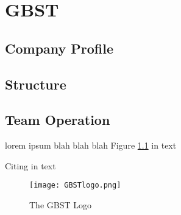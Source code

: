 \chapter{GBST}

\section{Company Profile}

\section{Structure}

\section{Team Operation}

lorem ipsum blah blah blah Figure \ref{gbstlogo} in text

Citing \cite{gbstlogo} in text

\vspace{0.5cm}
\begin{figure}[ht!]
\centering
\texttt{[image: GBSTlogo.png]}
\caption{The GBST Logo}
\label{gbstlogo}
\end{figure}

\begin{comment}
\texttt{[image: GBSTlogo.png]}
\end{comment}

